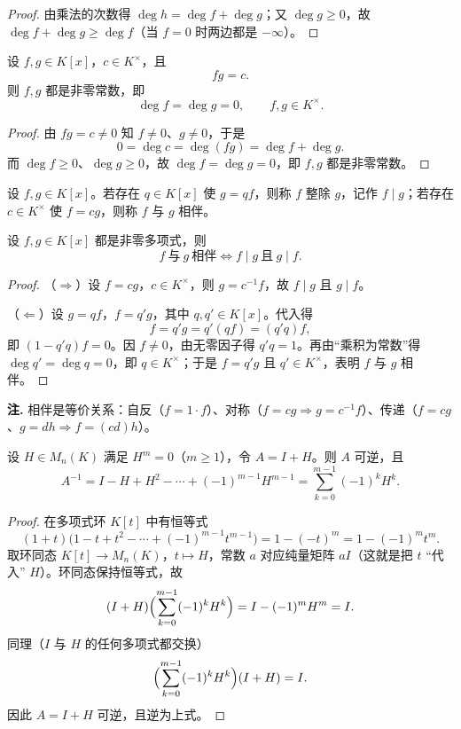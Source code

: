 \begin{proof}
由乘法的次数得 \(\deg h=\deg f+\deg g\)；又 \(\deg g\ge0\)，故 \(\deg f+\deg g\ge\deg f\)（当 \(f=0\) 时两边都是 \(-\infty\)）。
\end{proof}

\begin{proposition}[乘积为常数]
设 \(f,g\in K[x]\)，\(c\in K^\times\)，且
\[
fg=c .
\]
则 \(f,g\) 都是非零常数，即
\[
\deg f=\deg g=0,\qquad f,g\in K^\times .
\]
\end{proposition}

\begin{proof}
由 \(fg=c\ne0\) 知 \(f\ne0\)、\(g\ne0\)，于是
\[
0=\deg c=\deg(fg)=\deg f+\deg g .
\]
而 \(\deg f\ge0\)、\(\deg g\ge0\)，故 \(\deg f=\deg g=0\)，即 \(f,g\) 都是非零常数。
\end{proof}

\begin{definition}[整除与相伴]
设 \(f,g\in K[x]\)。若存在 \(q\in K[x]\) 使 \(g=qf\)，则称 \(f\) 整除 \(g\)，记作 \(f\mid g\)；若存在 \(c\in K^\times\) 使 \(f=cg\)，则称 \(f\) 与 \(g\) 相伴。
\end{definition}

\begin{corollary}[相伴的等价刻画]
设 \(f,g\in K[x]\) 都是非零多项式，则
\[
f\ \text{与}\ g\ \text{相伴}\iff f\mid g\ \text{且}\ g\mid f .
\]
\end{corollary}

\begin{proof}
（\(\Rightarrow\)）设 \(f=cg\)，\(c\in K^\times\)，则 \(g=c^{-1}f\)，故 \(f\mid g\) 且 \(g\mid f\)。

（\(\Leftarrow\)）设 \(g=qf\)，\(f=q'g\)，其中 \(q,q'\in K[x]\)。代入得
\[
f=q'g=q'(qf)=(q'q)f,
\]
即 \((1-q'q)f=0\)。因 \(f\ne0\)，由无零因子得 \(q'q=1\)。再由“乘积为常数”得 \(\deg q'=\deg q=0\)，即 \(q\in K^\times\)；于是 \(f=q'g\) 且 \(q'\in K^\times\)，表明 \(f\) 与 \(g\) 相伴。
\end{proof}

\noindent\textbf{注.} 相伴是等价关系：自反（\(f=1\cdot f\)）、对称（\(f=cg\Rightarrow g=c^{-1}f\)）、传递（\(f=cg\)、\(g=dh\Rightarrow f=(cd)h\)）。

\begin{theorem}[幂零扰动的可逆性]
设 \(H\in M_n(K)\) 满足 \(H^m=0\)（\(m\ge1\)），令 \(A=I+H\)。则 \(A\) 可逆，且
\[
A^{-1}=I-H+H^2-\cdots+(-1)^{m-1}H^{m-1}
=\sum_{k=0}^{m-1}(-1)^kH^k .
\]
\end{theorem}

\begin{proof}
在多项式环 \(K[t]\) 中有恒等式
\[
(1+t)\bigl(1-t+t^2-\cdots+(-1)^{m-1}t^{m-1}\bigr)=1-(-t)^m=1-(-1)^mt^m .
\]
取环同态 \(K[t]\to M_n(K)\)，\(t\mapsto H\)，常数 \(a\) 对应纯量矩阵 \(aI\)（这就是把 \(t\) “代入” \(H\)）。环同态保持恒等式，故
\[
(I+H)\Bigl(\sum_{k=0}^{m-1}(-1)^kH^k\Bigr)=I-(-1)^mH^m=I .
\]
同理（\(I\) 与 \(H\) 的任何多项式都交换）
\[
\Bigl(\sum_{k=0}^{m-1}(-1)^kH^k\Bigr)(I+H)=I .
\]
因此 \(A=I+H\) 可逆，且逆为上式。
\end{proof}

